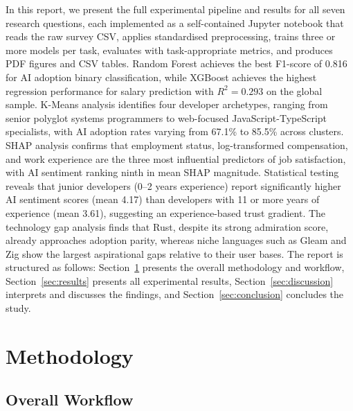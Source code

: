 \documentclass[journal, onecolumn]{IEEEtran}
\begin{document}
In this report, we present the full experimental pipeline and results for all seven research questions, each implemented as a self-contained Jupyter notebook that reads the raw survey CSV, applies standardised preprocessing, trains three or more models per task, evaluates with task-appropriate metrics, and produces PDF figures and CSV tables.
Random Forest achieves the best F1-score of 0.816 for AI adoption binary classification, while XGBoost achieves the highest regression performance for salary prediction with $R^2 = 0.293$ on the global sample.
K-Means analysis identifies four developer archetypes, ranging from senior polyglot systems programmers to web-focused JavaScript-TypeScript specialists, with AI adoption rates varying from 67.1\% to 85.5\% across clusters.
SHAP analysis confirms that employment status, log-transformed compensation, and work experience are the three most influential predictors of job satisfaction, with AI sentiment ranking ninth in mean SHAP magnitude.
Statistical testing reveals that junior developers (0--2 years experience) report significantly higher AI sentiment scores (mean 4.17) than developers with 11 or more years of experience (mean 3.61), suggesting an experience-based trust gradient.
The technology gap analysis finds that Rust, despite its strong admiration score, already approaches adoption parity, whereas niche languages such as Gleam and Zig show the largest aspirational gaps relative to their user bases.
The report is structured as follows: Section~\ref{sec:methodology} presents the overall methodology and workflow, Section~\ref{sec:results} presents all experimental results, Section~\ref{sec:discussion} interprets and discusses the findings, and Section~\ref{sec:conclusion} concludes the study.

\section{Methodology}
\label{sec:methodology}

\subsection{Overall Workflow}
\end{document}
